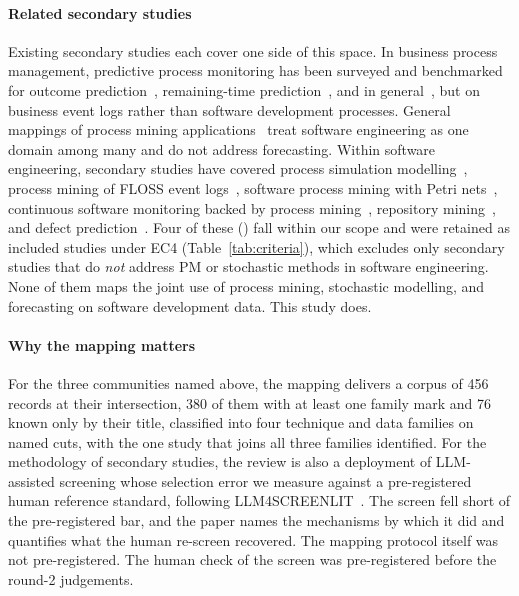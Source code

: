 \paragraph{Related secondary studies} Existing secondary studies each cover
one side of this space. In business process management, predictive process
monitoring has been surveyed and benchmarked for outcome
prediction~\cite{teinemaa2019outcome}, remaining-time
prediction~\cite{verenich2019remaining}, and in
general~\cite{marquezchamorro2018predictive}, but on business event logs
rather than software development processes. General mappings of process
mining applications~\cite{garcia2019pmmapping,thiede2018pmorg} treat software
engineering as one domain among many and do not address forecasting. Within
software engineering, secondary studies have covered process simulation
modelling~\cite{zhang2010simulation,ali2014simulation}, process mining of
FLOSS event logs~\cite{mukala2015floss}, software process mining with Petri
nets~\cite{thamizharasan2016petri}, continuous software monitoring backed by
process mining~\cite{stepanov2026continuous}, repository
mining~\cite{kagdi2007msr}, and defect prediction~\cite{hall2012fault}. Four
of these (\cite{zhang2010simulation,mukala2015floss,thamizharasan2016petri,stepanov2026continuous})
fall within our scope and were retained as included studies under EC4
(Table~\ref{tab:criteria}), which excludes only secondary studies that do
\emph{not} address PM or stochastic methods in software engineering. None of
them maps the joint use of process mining, stochastic modelling, and
forecasting on software development data. This study does.

\paragraph{Why the mapping matters} For the three communities named
above, the mapping delivers a corpus of 456 records at their
intersection, 380 of them with at least one family mark and 76 known only
by their title, classified into four technique and data families on named
cuts, with the one study that joins all three families identified. For
the methodology of secondary studies, the review is also a deployment of
LLM-assisted screening whose selection error we measure against a
pre-registered human reference standard, following
LLM4SCREENLIT~\cite{llm4screenlit2025}. The screen fell short of the
pre-registered bar, and the paper names the mechanisms by which it did
and quantifies what the human re-screen recovered. The mapping protocol itself was
not pre-registered. The human check of the screen was pre-registered before
the round-2 judgements.

